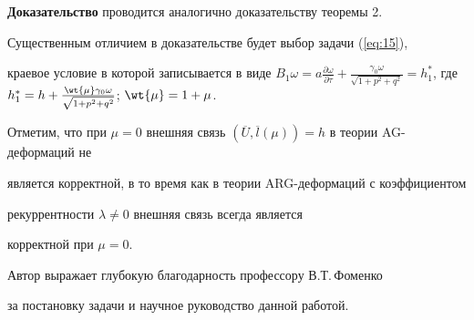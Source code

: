 {\bf Доказательство} проводится аналогично доказательству теоремы 2. 


Существенным отличием в доказательстве будет выбор задачи (\ref{eq:15}),


краевое условие в которой записывается в виде $B_1 \omega=a\frac{\partial


\omega}{\partial \overline \tau}+\frac{\gamma_0 \omega}{\sqrt {1+p^2+q^2}}


= h_1^\ast$, где $h_1^\ast=h+\frac{\wt {\mu }\gamma _0 \omega }


{\sqrt {1+p^2+q^2} }$; $\wt {\mu }=1+\mu$.





\begin{notenonum}


Отметим, что при $\mu=0$ внешняя связь $ ({\overline U ,


\overline l (\mu)})=h$ в теории AG-деформаций не 


является корректной, в то время как в теории ARG-деформаций с коэффициентом 


рекуррентности $\lambda \ne 0$ внешняя связь всегда является 


корректной при $\mu=0$.


\end{notenonum}





Автор выражает глубокую благодарность профессору В.Т.\,Фоменко  


за постановку задачи и научное руководство данной работой.





